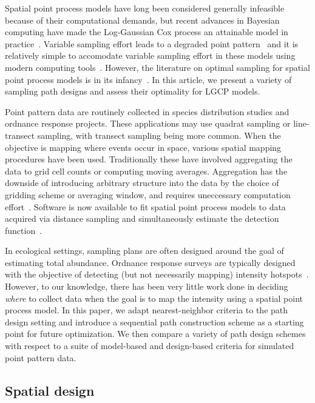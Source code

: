 \documentclass[review]{elsarticle}
\begin{document}
Spatial point process models have long been considered generally infeasible
because of their computational demands, but recent advances in Bayesian
computing have made the Log-Gaussian Cox process an attainable model in
practice~\citep{rueetal, lindgrenetal, illianetal, simpsonetal}. Variable
sampling effort leads to a degraded point pattern~\cite{chakrabortyetal} and
it is relatively simple to accomodate variable sampling effort in these models
using modern computing tools~\citep{yuanetal}. However, the literature on
optimal sampling for spatial point process models is in its
infancy~\citep{liuvanhatalo}. In this article, we present a variety of sampling
path designs and assess their optimality for LGCP models.

Point pattern data are routinely collected in species distribution studies and
ordnance response projects. These applications may use quadrat sampling or
line-transect sampling, with transect sampling being more common. When the
objective is mapping where events occur in space, various spatial mapping
procedures have been used. Traditionally these have involved aggregating the
data to grid cell counts or computing moving averages. Aggregation has the
downside of introducing arbitrary structure into the data by the choice of
gridding scheme or averaging window, and requires uneccessary computation
effort~\citep{simpsonetal}. Software is now available to fit spatial point
process models to data acquired via distance sampling and simultaneously
estimate the detection function~\citep{dspat,baser}.

In ecological settings, sampling plans are often designed around the goal of
estimating total abundance. Ordnance response surveys are typically designed
with the objective of detecting (but not necessarily mapping) intensity
hotspots~\citep{em200-1-15}. However, to our knowledge, there has been very
little work done in deciding \emph{where} to collect data when the goal is to
map the intensity using a spatial point process model. In this paper, we adapt
nearest-neighbor criteria to the path design setting and introduce a sequential
path construction scheme as a starting point for future optimization. We then
compare a variety of path design schemes with respect to a suite of
model-based and design-based criteria for simulated point pattern data.


\subsection{Spatial design}
\end{document}
